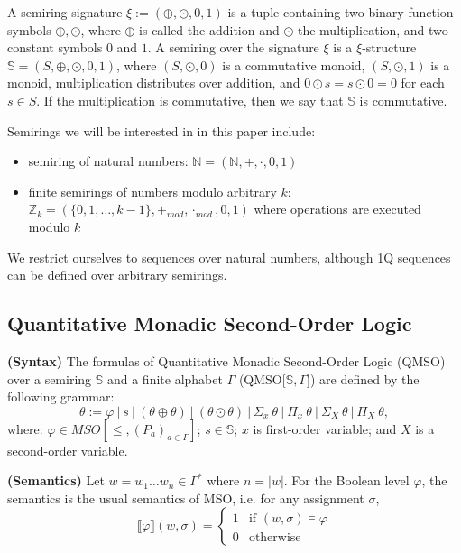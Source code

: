 \documentclass[12pt]{article}
\theoremstyle{definition}
\begin{document}
A semiring signature $\xi := (\oplus, \odot, 0, 1)$ is a tuple containing two binary function symbols $\oplus, \odot$, where $\oplus$ is called the addition and $\odot$ the multiplication, and two constant symbols $0$ and $1$. A semiring over the signature $\xi$ is a $\xi$-structure $\mathbb{S} = (S, \oplus, \odot, 0, 1)$, where $(S, \odot, 0)$ is a commutative monoid, $(S, \odot, 1)$ is a monoid, multiplication distributes over addition, and $0 \odot s = s \odot 0 = 0$ for each $s \in S$. If the multiplication is commutative, then we say that $\mathbb{S}$ is commutative.

Semirings we will be interested in in this paper include:

\begin{itemize}
    \item semiring of natural numbers: $\mathbb{N} = (\mathbb{N}, +, \cdot, 0, 1)$
    \item finite semirings of numbers modulo arbitrary $k$: $ \mathbb{Z}_k = (\{0,1,\ldots,k-1\}, +_{mod}, \cdot_{mod}, 0, 1)$ where operations are executed modulo $k$
\end{itemize}

We restrict ourselves to sequences over natural numbers, although 1Q sequences can be defined over arbitrary semirings.

\subsection{Quantitative Monadic Second-Order Logic}

\textbf{(Syntax)} The formulas of Quantitative Monadic Second-Order Logic (QMSO) over a semiring $\mathbb{S}$ and a finite alphabet $\Gamma$ (QMSO[$\mathbb{S}, \Gamma$]) are defined by the following grammar:
$$ \theta := \varphi \ | \ s \ | \ (\theta \oplus \theta) \ | \ (\theta \odot \theta) \ | \ \Sigma_x \ \theta \ | \ \Pi_x \ \theta \ | \ \Sigma_X \ \theta \ | \ \Pi_X \ \theta,$$
where: $\varphi \in MSO[\leq, (P_a)_{a \in \Gamma}]$; $s \in \mathbb{S}$; $x$ is first-order variable; and $X$ is a second-order variable.

\textbf{(Semantics)} Let $w 
= w_1 \dots w_n \in \Gamma^*$ where $n = |w|$. For the Boolean level $\varphi$, the semantics is the usual semantics of MSO, i.e. for any assignment $\sigma$,
\begin{equation*}
    \llbracket\varphi\rrbracket(w, \sigma) =
      \begin{cases}
        1 & \text{if $(w, \sigma) \models \varphi$}\\
        0 & \text{otherwise}
      \end{cases}       
\end{equation*}
\end{document}
